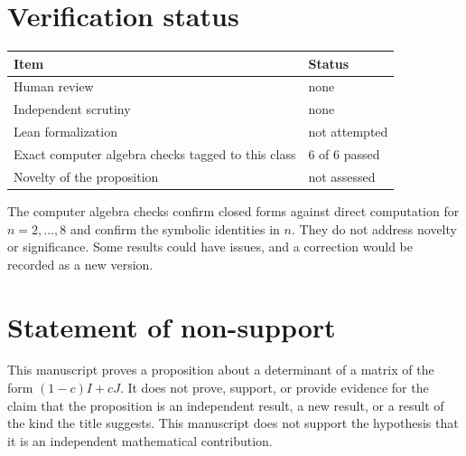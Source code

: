 \documentclass[11pt]{article}
\begin{document}
\section{Verification status}
\begin{center}
\small
\begin{tabular}{ll}
\toprule
Item & Status \\
\midrule
Human review & none \\
Independent scrutiny & none \\
Lean formalization & not attempted \\
Exact computer algebra checks tagged to this class & 6 of 6 passed \\
Novelty of the proposition & not assessed \\
\bottomrule
\end{tabular}
\end{center}
The computer algebra checks confirm closed forms against direct computation for $n=2,\dots,8$ and confirm the symbolic identities in $n$. They do not address novelty or significance. Some results could have issues, and a correction would be recorded as a new version.

\section{Statement of non-support}
This manuscript proves a proposition about a determinant of a matrix of the form $(1-c)I+cJ$. It does not prove, support, or provide evidence for the claim that the proposition is an independent result, a new result, or a result of the kind the title suggests. This manuscript does not support the hypothesis that it is an independent mathematical contribution.


\end{document}
